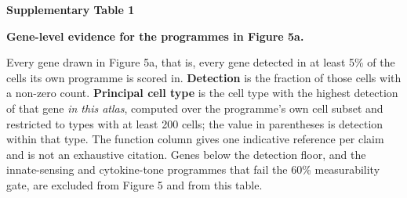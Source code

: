 \documentclass[10pt]{article}
\begin{document}
{\large\textbf{Supplementary Table 1}\par}\vspace{2pt}
{\textbf{Gene-level evidence for the programmes in Figure 5a.}\par}\vspace{6pt}

{\footnotesize Every gene drawn in Figure 5a, that is, every gene detected in at least 5\%
of the cells its own programme is scored in. \textbf{Detection} is the fraction of those
cells with a non-zero count. \textbf{Principal cell type} is the cell type with the highest
detection of that gene \emph{in this atlas}, computed over the programme's own cell subset
and restricted to types with at least 200 cells; the value in parentheses is detection
within that type. The function column gives one indicative reference per claim and is not an
exhaustive citation. Genes below the detection floor, and the innate-sensing and
cytokine-tone programmes that fail the 60\% measurability gate, are excluded from Figure 5
and from this table.\par}
\end{document}
